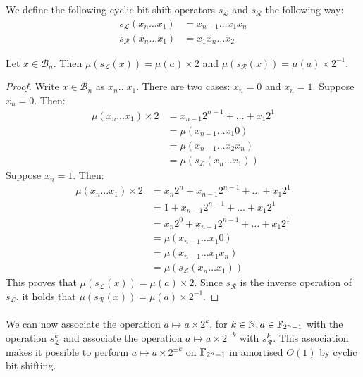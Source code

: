 \theoremstyle{definition}
\begin{definition}
We define the following cyclic bit shift operators $s_\mathcal{L}$ and $s_\mathcal{R}$ the following way:
\begin{align*}
    s_\mathcal{L}(x_n \dots x_1) &= x_{n-1} \dots x_1 x_n\\
    s_\mathcal{R}(x_n \dots x_1) &= x_1 x_n \dots x_2
\end{align*}
\end{definition}

\begin{lemma}
Let $x \in \mathcal{B}_n$. Then $\mu(s_\mathcal{L}(x)) = \mu(a) \times 2$ and $\mu(s_\mathcal{R}(x)) = \mu(a) \times 2^{-1}$.
\end{lemma}
\begin{proof}
Write $x \in \mathcal{B}_n$ as $x_n \dots x_1$. There are two cases: $x_n = 0$ and $x_n = 1$.
Suppose $x_n = 0$. Then:
\begin{align*}
    \mu(x_n \dots x_1) \times 2 &= x_{n-1} 2^{n-1} + \dots + x_1 2^1\\
    &= \mu(x_{n-1} \dots x_1 0)\\
    &= \mu(x_{n-1} \dots x_2 x_n)\\
    &= \mu(s_\mathcal{L}(x_n \dots x_1))
\end{align*}
Suppose $x_n = 1$. Then:
\begin{align*}
    \mu(x_n \dots x_1) \times 2 &= x_n 2^n + x_{n-1} 2^{n-1} + \dots + x_1 2^1\\
    &= 1 + x_{n-1} 2^{n-1} + \dots + x_1 2^1\\
    &= x_n 2^0 + x_{n-1} 2^{n-1} + \dots + x_1 2^1\\
    &= \mu(x_{n-1} \dots x_1 0)\\
    &= \mu(x_{n-1} \dots x_1 x_n)\\
    &= \mu(s_\mathcal{L}(x_n \dots x_1))
\end{align*}
This proves that $\mu(s_\mathcal{L}(x)) = \mu(a) \times 2$. Since $s_\mathcal{R}$ is the inverse operation of $s_\mathcal{L}$, it holds that $\mu(s_\mathcal{R}(x)) = \mu(a) \times 2^{-1}$.
\end{proof}

\paragraph{}
We can now associate the operation $a \mapsto a \times 2^k$, for $k \in \mathbb{N}, a \in \mathbb{F}_{2^n - 1}$ with the operation $s_\mathcal{L}^k$ and associate the operation $a \mapsto a \times 2^{-k}$ with $s_\mathcal{R}^k$. This association makes it possible to perform $a \mapsto a \times 2^{\pm k}$ on $\mathbb{F}_{2^n - 1}$ in amortised $O(1)$ by cyclic bit shifting.

